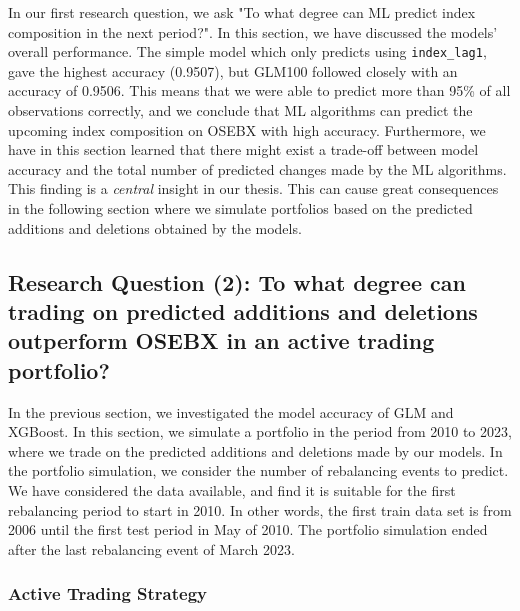 In our first research question, we ask "To what degree can ML predict index composition in the next period?". In this section, we have discussed the models' overall performance. The simple model which only predicts using \texttt{index\_lag1}, gave the highest accuracy (0.9507), but GLM100 followed closely with an accuracy of 0.9506. This means that we were able to predict more than 95\% of all observations correctly, and we conclude that ML algorithms can predict the upcoming index composition on OSEBX with high accuracy. Furthermore, we have in this section learned that there might exist a trade-off between model accuracy and the total number of predicted changes made by the ML algorithms. This finding is a \textit{central} insight in our thesis. This can cause great consequences in the following section where we simulate portfolios based on the predicted additions and deletions obtained by the models. 


\subsection{Research Question (2): To what degree can trading on predicted additions and deletions outperform OSEBX in an active trading portfolio?}

In the previous section, we investigated the model accuracy of GLM and XGBoost. In this section, we simulate a portfolio in the period from 2010 to 2023, where we trade on the predicted additions and deletions made by our models. In the portfolio simulation, we consider the number of rebalancing events to predict. We have considered the data available, and find it is suitable for the first rebalancing period to start in 2010. In other words, the first train data set is from 2006 until the first test period in May of 2010. The portfolio simulation ended after the last rebalancing event of March 2023. 

\subsubsection{Active Trading Strategy}

